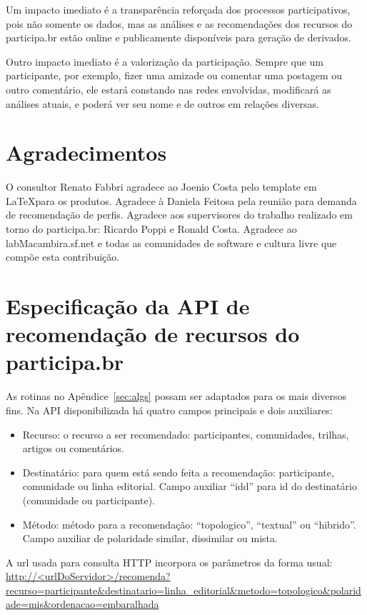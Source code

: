 \documentclass[12pt]{article}
\begin{document}
Um impacto imediato é a transparência reforçada dos processos participativos, pois não somente os dados, mas as análises e as recomendações dos recursos do participa.br estão online e publicamente disponíveis para geração de derivados.

Outro impacto imediato é a valorização da participação. Sempre que um participante, por exemplo, fizer uma amizade ou comentar uma postagem ou outro comentário, ele estará constando nas redes envolvidas, modificará as análises atuais, e poderá ver seu nome e de outros em relações diversas.

\section{Agradecimentos}
O consultor Renato Fabbri agradece ao Joenio Costa pelo template em \LaTeX para os produtos. Agradece à Daniela Feitosa pela reunião para demanda de recomendação de perfis. Agradece aos supervisores do trabalho realizado em torno do participa.br: Ricardo Poppi e Ronald Costa. Agradece ao labMacambira.sf.net e todas as comunidades de software e cultura livre que compõe esta contribuição.
\newpage

\newpage

\newpage
\printindex
\newpage
%
\appendix
\section{Especificação da API de recomendação de recursos do participa.br}\label{sec:api}
As rotinas no Apêndice~\ref{sec:algs} possam ser adaptados para os mais diversos fins. Na API disponibilizada há quatro campos principais e dois auxiliares:
\begin{itemize}
    \item Recurso: o recurso a ser recomendado: participantes, comunidades, trilhas, artigos ou comentários.
    \item Destinatário: para quem está sendo feita a recomendação: participante, comunidade ou linha editorial. Campo auxiliar ``idd'' para id do destinatário (comunidade ou participante).
    \item Método: método para a recomendação: ``topologico'', ``textual'' ou ``hibrido''. Campo auxiliar de polaridade similar, dissimilar ou mista.
\end{itemize} 
A url usada para consulta HTTP incorpora os parâmetros da forma usual:
\url{http://<urlDoServidor>/recomenda?recurso=participante&destinatario=linha_editorial&metodo=topologico&polaridade=mis&ordenacao=embaralhada}
\end{document}
